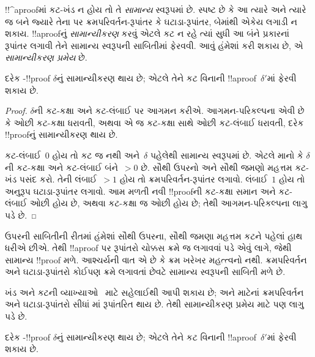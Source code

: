 \documentclass[../../../include/open-logic-section]{subfiles}
\begin{document}


!!^a{proof}માં કટ-ખંડ
ન હોય તો તે
\emph{સામાન્ય} સ્વરૂપમાં
છે. સ્પષ્ટ છે કે
આ ત્યારે અને ત્યારે
જ બને જ્યારે તેના
પર ક્રમપરિવર્તન-રૂપાંતર
કે ઘટાડા-રૂપાંતર,
બેમાંથી એકેય લગાડી
ન શકાય.
!!a{proof}નું
\emph{સામાન્યીકરણ} કરવું
એટલે કટ ન રહે
ત્યાં સુધી આ બંને
પ્રકારનાં રૂપાંતર
લગાવી તેને સામાન્ય
સ્વરૂપની સાબિતીમાં
ફેરવવી. આવું હંમેશાં
કરી શકાય છે, એ
\emph{સામાન્યીકરણ પ્રમેય}
છે.

\begin{thm}
દરેક -!!{proof}
$\delta$નું સામાન્યીકરણ
થાય છે; એટલે તેને
કટ વિનાની
!!a{proof}~$\delta'$માં
ફેરવી શકાય છે.
\end{thm}

\begin{proof}
  $\delta$ની કટ-કક્ષા
  અને કટ-લંબાઈ પર
  આગમન કરીએ.
  આગમન-પરિકલ્પના એવી
  છે કે ઓછી કટ-કક્ષા
  ધરાવતી, અથવા એ
  જ કટ-કક્ષા સાથે
  ઓછી કટ-લંબાઈ ધરાવતી,
  દરેક !!{proof}નું
  સામાન્યીકરણ થાય છે.

  કટ-લંબાઈ~$0$
  હોય તો કટ જ
  નથી અને~$\delta$
  પહેલેથી સામાન્ય
  સ્વરૂપમાં છે.
  એટલે માનો કે
  $\delta$ની કટ-કક્ષા
  અને કટ-લંબાઈ
  બંને~$> 0$ છે.
  સૌથી ઉપરનો અને
  સૌથી જમણો મહત્તમ
  કટ-ખંડ પસંદ કરો.
  તેની લંબાઈ~$>1$
  હોય તો
  ક્રમપરિવર્તન-રૂપાંતર
  લગાવો. લંબાઈ~$1$
  હોય તો અનુરૂપ
  ઘટાડા-રૂપાંતર
  લગાવો. આમ મળતી
  નવી !!{proof}ની
  કટ-કક્ષા સમાન
  અને કટ-લંબાઈ ઓછી
  હોય છે, અથવા
  કટ-કક્ષા જ ઓછી
  હોય છે; તેથી
  આગમન-પરિકલ્પના
  લાગુ પડે છે.
\end{proof}

ઉપરની સાબિતીની રીતમાં
હંમેશાં સૌથી ઉપરના,
સૌથી જમણા મહત્તમ
કટને પહેલાં હાથ
ધરીએ છીએ. તેથી
!!a{proof} પર રૂપાંતરો
ચોક્કસ ક્રમે જ
લગાવવાં પડે એવું
લાગે, જેથી સામાન્ય
!!{proof} મળે.
આશ્ચર્યની વાત એ
છે કે ક્રમ ખરેખર
મહત્ત્વનો નથી.
ક્રમપરિવર્તન અને
ઘટાડા-રૂપાંતરો કોઈપણ
ક્રમે લગાવતાં છેવટે
સામાન્ય સ્વરૂપની
સાબિતી મળે છે.

ખંડ અને કટની
વ્યાખ્યાઓ~
માટે સહેલાઈથી આપી
શકાય છે; અને
 માટેનાં
ક્રમપરિવર્તન અને
ઘટાડા-રૂપાંતરો સીધાં
માં રૂપાંતરિત
થાય છે. તેથી
સામાન્યીકરણ પ્રમેય
 માટે પણ
લાગુ પડે છે.

\begin{thm}
દરેક -!!{proof}
$\delta$નું સામાન્યીકરણ
થાય છે; એટલે તેને
કટ વિનાની
!!a{proof}~$\delta'$માં
ફેરવી શકાય છે.
\end{thm}
\end{document}
